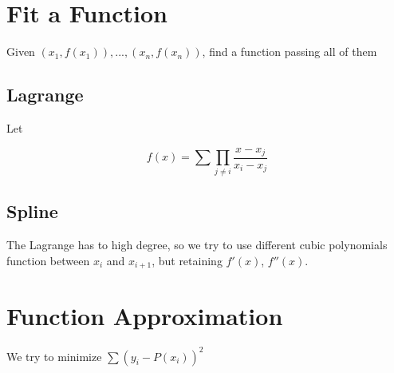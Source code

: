 \section{Fit a Function}

Given $(x_1, f(x_1)), . . . ,(x_n, f(x_n))$, find a
function passing all of them

\subsection{Lagrange}

Let 

\[
  f(x) = \sum \prod_{j \neq i} \frac{x-x_j}{x_i-x_j}
\]

\subsection{Spline}

The Lagrange has to high degree,
so we try to use different cubic
polynomials function between $x_i$ and $x_{i+1}$,
but retaining $f'(x)$, $f''(x)$.

\section{Function Approximation}

We try to minimize $\sum (y_i-P(x_i))^2 $
